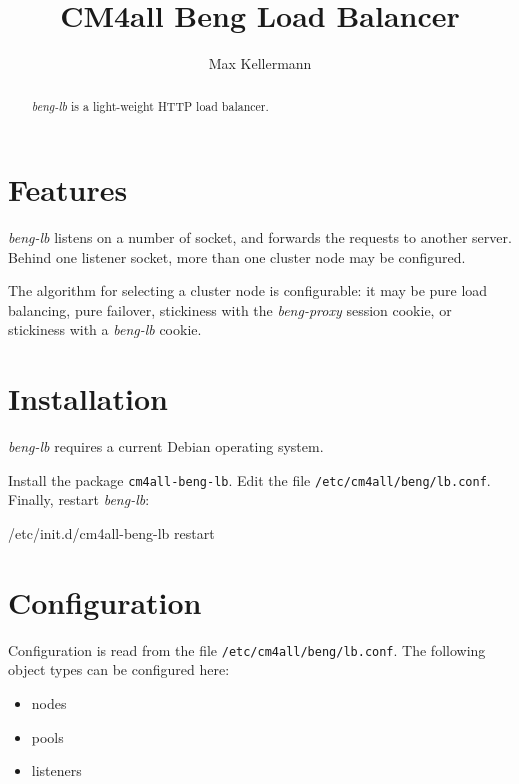 \documentclass[a4paper,12pt]{article}
\begin{document}
\title{CM4all Beng Load Balancer}
\author{Max Kellermann}

\maketitle

\begin{abstract}
\emph{beng-lb} is a light-weight HTTP load balancer.
\end{abstract}

\setcounter{tocdepth}{2}
\tableofcontents
\newpage

\section{Features}

\emph{beng-lb} listens on a number of socket, and forwards the
requests to another server.  Behind one listener socket, more than one
cluster node may be configured.

The algorithm for selecting a cluster node is configurable: it may be
pure load balancing, pure failover, stickiness with the
\emph{beng-proxy} session cookie, or stickiness with a \emph{beng-lb}
cookie.


\section{Installation}

\emph{beng-lb} requires a current Debian operating system.

Install the package \texttt{cm4all-beng-lb}.  Edit the file
\texttt{/etc/cm4all/beng/lb.conf}.  Finally, restart
\emph{beng-lb}:

\begin{verbatim*}
/etc/init.d/cm4all-beng-lb restart
\end{verbatim*}

\section{Configuration}

Configuration is read from the file
\texttt{/etc/cm4all/beng/lb.conf}.  The following object types can be
configured here:

\begin{itemize}
\item nodes
\item pools
\item listeners
\end{itemize}
\end{document}
